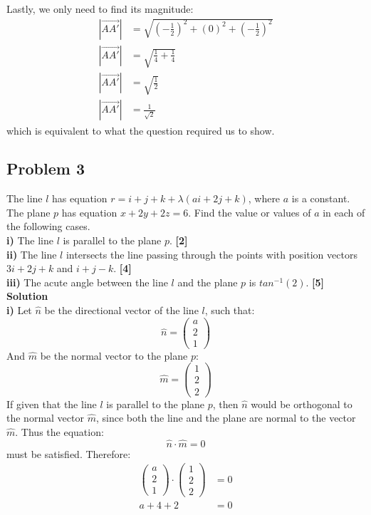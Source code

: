 \documentclass[hidelinks, a4paper, 12pt]{article}
\newcommand{\bd}{\textbf}
\newcommand{\nhat}{\hat{n}}
\newcommand{\mhat}{\hat{m}}
\newcommand{\n}{\\[\baselineskip]}
\begin{document}
            Lastly, we only need to find its magnitude:
            \[\begin{split}
                |\vec{AA'}| &= \sqrt{\left(-\frac{1}{2}\right)^ 2 + (0)^2 + \left(-\frac{1}{2}\right)^ 2}\\
                |\vec{AA'}| &= \sqrt{\frac{1}{4} + \frac{1}{4}}\\
                |\vec{AA'}| &= \sqrt{\frac{1}{2}}\\
                |\vec{AA'}| &= \frac{1}{\sqrt{2}}
            \end{split}\]
            which is equivalent to what the question required us to show.
        \subsection{Problem 3}
            The line $l$ has equation $r = i + j + k + \lambda(ai + 2j + k)$, where $a$ is a constant. The plane $p$ has equation
            $x + 2y + 2z = 6$. Find the value or values of $a$ in each of the following cases.\n
            \bd{i) }The line $l$ is parallel to the plane $p$. \bd{[2]}\n
            \bd{ii) }The line $l$ intersects the line passing through the points with position vectors $3i + 2j + k$ and $i + j - k$. \bd{[4]}\n
            \bd{iii) }The acute angle between the line $l$ and the plane $p$ is $tan^{-1}(2)$. \bd{[5]}\n
            \bd{Solution}\n
            \bd{i) }Let $\nhat$ be the directional vector of the line $l$, such that:
            \[\nhat = \begin{pmatrix} a \\ 2 \\ 1 \end{pmatrix}\]
            And $\mhat$ be the normal vector to the plane $p$:
            \[\mhat = \begin{pmatrix} 1 \\ 2 \\ 2 \end{pmatrix}\]
            If given that the line $l$ is parallel to the plane $p$, then $\nhat$ would be orthogonal to the normal vector $\mhat$, since both the line
            and the plane are normal to the vector $\mhat$. Thus the equation:
            \[\nhat \cdot \mhat = 0\]
            must be satisfied. Therefore:
            \[\begin{split}
                \begin{pmatrix} a \\ 2 \\ 1 \end{pmatrix} \cdot \begin{pmatrix} 1 \\ 2 \\ 2 \end{pmatrix} &= 0\\
                a + 4 + 2 &= 0
            \end{split}\]
\end{document}
